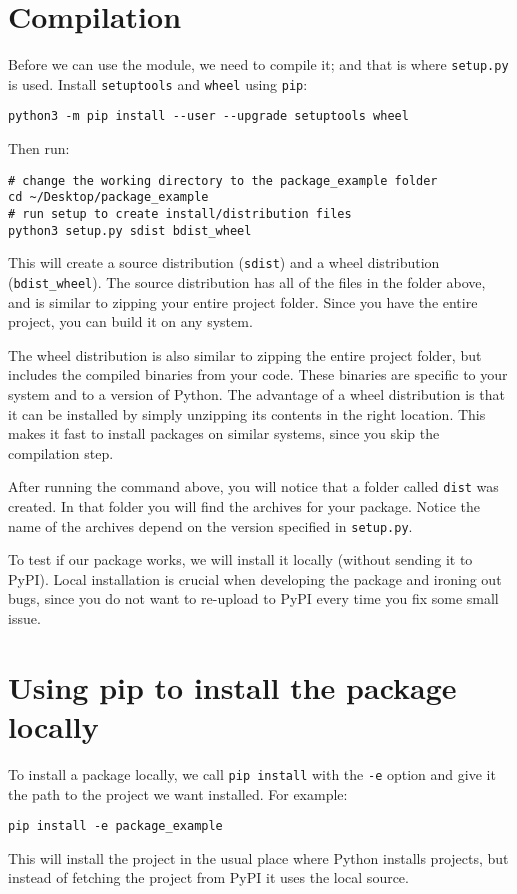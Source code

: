 \documentclass[12pt, a4paper]{article}
\begin{document}
\section*{Compilation}
\label{sec:orgadc38ed}
Before we can use the module, we need to compile it; and that is where \texttt{setup.py} is used.
Install \texttt{setuptools} and \texttt{wheel} using \texttt{pip}:
\lstset{language=bash,label= ,caption= ,captionpos=b,numbers=none}
\begin{lstlisting}
python3 -m pip install --user --upgrade setuptools wheel
\end{lstlisting}
Then run:
\lstset{language=bash,label= ,caption= ,captionpos=b,numbers=none}
\begin{lstlisting}
# change the working directory to the package_example folder
cd ~/Desktop/package_example
# run setup to create install/distribution files
python3 setup.py sdist bdist_wheel
\end{lstlisting}
This will create a source distribution (\texttt{sdist}) and a wheel distribution (\texttt{bdist\_wheel}).
The source distribution has all of the files in the folder above, and is similar to zipping your entire project folder.
Since you have the entire project, you can build it on any system.

The wheel distribution is also similar to zipping the entire project folder, but includes the compiled binaries from your code. These binaries are specific to your system and to a version of Python. The advantage of a wheel distribution is that it can be installed by simply unzipping its contents in the right location. This makes it fast to install packages on similar systems, since you skip the compilation step.

After running the command above, you will notice that a folder called \texttt{dist} was created. In that folder you will find the archives for your package.
Notice the name of the archives depend on the version specified in \texttt{setup.py}.

To test if our package works, we will install it locally (without sending it to PyPI). Local installation is crucial when developing the package and ironing out bugs, since you do not want to re-upload to PyPI every time you fix some small issue.
\section*{Using pip to install the package locally}
\label{sec:orged44f22}
To install a package locally, we call \texttt{pip install} with the \texttt{-e} option and give it the path to the project we want installed.
For example:
\lstset{language=bash,label= ,caption= ,captionpos=b,numbers=none}
\begin{lstlisting}
pip install -e package_example
\end{lstlisting}
This will install the project in the usual place where Python installs projects, but instead of fetching the project from PyPI it uses the local source.
\end{document}
